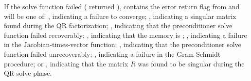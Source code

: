 {{  If the {\idaspgmr} solve function failed ( returned 
  ),  contains the error return flag from
   and will be one of:
  , indicating a failure to converge;
  , indicating a singular matrix found during the
  QR factorization;
  , indicating that the preconditioner solve
  function  failed recoverably;
  , indicating that the {\spgmr} memory is ;
  , indicating a failure in the Jacobian-times-vector 
  function;
  , indicating that the preconditioner solve
  function  failed unrecoverably;
  , indicating a failure in the Gram-Schmidt procedure;
  or , indicating that the matrix $R$ was found to 
  be singular during the QR solve phase.
}
%
%
}

